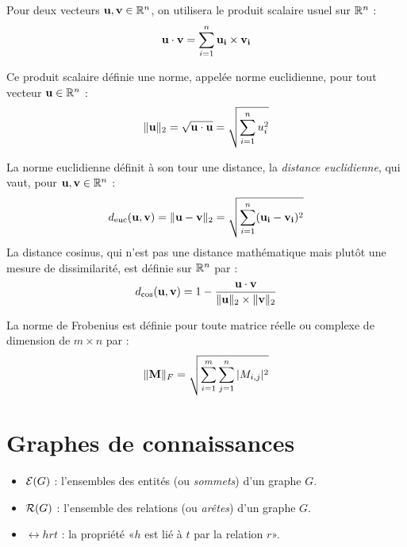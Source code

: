 Pour deux vecteurs $\bf{u, v} \in \R^n$, on utilisera le produit scalaire usuel sur $\R^n$ :
\begin{equation}
    \bf{u \cdot v} = \sum_{i=1}^{n} \bf{u_i \times v_i}
\end{equation}

Ce produit scalaire définie une norme, appelée norme euclidienne, pour tout vecteur $\bf{u} \in \R^n$ :
\begin{equation}
    \| \bf{u} \|_2 = \sqrt{\bf{u \cdot u}} = \sqrt{\sum_{i =1}^{n} u_i^2}
\end{equation}

La norme euclidienne définit à son tour une distance, la \textit{distance euclidienne}, qui vaut, pour $\bf{u, v} \in \R^n$ :
\begin{equation}
        d_\text{euc}(\bf{u, v}) = \| \bf{u - v} \|_2 = \sqrt{\sum_{i = 1}^{n} (\bf{u_i - v_i})^2}
\end{equation}
La distance cosinus, qui n'est pas une distance mathématique mais plutôt une mesure de dissimilarité, est définie sur $\R^n$ par :
\begin{equation}
    d_\text{cos}(\bf{u, v}) = 1 - \frac{\bf{u \cdot v}}{\| \bf{u} \|_2 \times \| \bf{v} \|_2 }
\end{equation}

La norme de Frobenius est définie pour toute matrice réelle ou complexe de dimension  de $m \times n$ par :
\begin{equation}
\| \bf{M} \|_F = \sqrt{\sum_{i=1}^{m} \sum_{j = 1}^{n} |M_{i, j}|^2}
\end{equation}

\section*{Graphes de connaissances}

\begin{itemize}
    \item $\Ent(G)$ : l'ensembles des entités (ou \textit{sommets}) d'un graphe $G$.
    \item $\Rel(G)$ : l'ensemble des relations (ou \textit{arêtes}) d'un graphe $G$.
    \item $\rel{h}{r}{t}$ : la propriété «$h$ est lié à $t$ par la relation $r$».
\end{itemize}